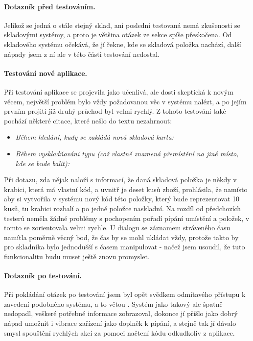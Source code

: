 \paragraph{Dotazník před testováním.} Jelikož se jedná o stále stejný sklad, ani poslední testovaná nemá zkušenosti se skladovými systémy, a proto je většina otázek ze sekce  spíše přeskočena. Od skladového systému očekává, že jí řekne, kde se skladová položka nachází, další nápady jsem z ní ale v této části testování nedostal.

\paragraph{Testování nové aplikace.} Při testování aplikace se projevila jako učenlivá, ale dosti skeptická k novým věcem, největší problém bylo vždy požadovanou věc v systému nalézt, a po jejím prvním projití již druhý průchod byl velmi rychlý. Z tohoto testování také pochází některé citace, které nešlo do textu nezahrnout:
\begin{itemize}
	\item \emph{Během hledání, kudy se zakládá nová skladová karta:} 
	\item \emph{Během vyskladňování typu  (což vlastně znamená přemístění na jiné místo, kde se bude balit):} 
\end{itemize}
Při dotazu, zda nějak naloží s informací, že daná skladová položka je někdy v krabici, která má vlastní kód, a uvnitř je deset kusů zboží, prohlásila, že namísto aby si vytvořila v systému nový kód této položky, který bude reprezentovat 10 kusů, tu krabici rozbalí a po jedné položce naskladní. Na rozdíl od předchozích testerů neměla žádné problémy s pochopením pořadí pípání umístění a položek, v tomto se zorientovala velmi rychle. U dialogu se záznamem stráveného času namítla poměrně věcný bod, že čas by se mohl ukládat vždy, protože takto by pro skladníka bylo jednodušší s časem manipulovat - načež jsem usoudil, že tuto funkcionalitu budu muset ještě znovu promyslet.

\paragraph{Dotazník po testování.} Při pokládání otázek po testování jsem byl opět svědkem odmítavého přístupu k zavedení podobného systému, a to větou . Systém jako takový ale špatně nedopadl, veškeré potřebné informace zobrazoval, dokonce jí přišlo jako dobrý nápad umožnit i vibrace zařízení jako doplněk k pípání, a stejně tak jí dávalo smysl spouštění rychlých akcí za pomoci načtení kódu odkudkoliv z aplikace.

